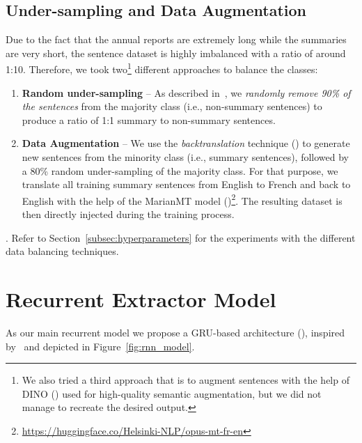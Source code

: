\subsection{Under-sampling and Data Augmentation}\label{subsec:data_augmentation}
Due to the fact that the annual reports are extremely long while the summaries are very short, the sentence dataset is highly imbalanced with a ratio of around 1:10.
Therefore, we took two\footnote{
    We also tried a third approach that is to augment sentences with the help of DINO (\cite{schick2021generating}) used for high-quality
    semantic augmentation, but we did not manage to recreate the desired output.
} different approaches to balance the classes:
\begin{enumerate}
    \item \textbf{Random under-sampling} -- As described in~\cite{weiss2013foundations, wongvorachan2023undersampling}, we \emph{randomly remove 90\% of the sentences} from the majority class (i.e., non-summary sentences) to produce a ratio of 1:1 summary to non-summary sentences.
    \item \textbf{Data Augmentation} -- We use the \emph{backtranslation} technique (\cite{hoang-etal-2018-iterative}) to generate new sentences from the minority class (i.e., summary sentences), followed by a 80\% random under-sampling of the majority class.
    For that purpose, we translate all training summary sentences from English to French and back to English with the help of the MarianMT model (\cite{junczysdowmunt2018marian})\footnote{\url{https://huggingface.co/Helsinki-NLP/opus-mt-fr-en}}.
    The resulting dataset is then directly injected during the training process.
\end{enumerate}.
Refer to Section~\ref{subsec:hyperparameters} for the experiments with the different data balancing techniques.

\section{Recurrent Extractor Model}\label{sec:rnn_model}
As our main recurrent model we propose a GRU-based architecture (\cite{cho-etal-2014-learning}), inspired by~\cite{zmandar-etal-2021-joint} and depicted in Figure~\ref{fig:rnn_model}. \\

